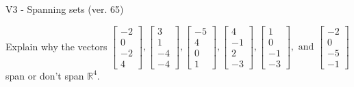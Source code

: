\begin{exercise}
  \begin{exerciseTitle}V3 - Spanning sets (ver. 65)\end{exerciseTitle}
  \begin{exerciseStatement}
    Explain why the vectors \(\left[\begin{array}{r}
-2 \\
0 \\
-2 \\
4
\end{array}\right] , \left[\begin{array}{r}
3 \\
1 \\
-4 \\
-4
\end{array}\right] , \left[\begin{array}{r}
-5 \\
4 \\
0 \\
1
\end{array}\right] , \left[\begin{array}{r}
4 \\
-1 \\
2 \\
-3
\end{array}\right] , \left[\begin{array}{r}
1 \\
0 \\
-1 \\
-3
\end{array}\right] , \text{ and } \left[\begin{array}{r}
-2 \\
0 \\
-5 \\
-1
\end{array}\right]\) span or don't span \(\mathbb{R}^4\). 
	



\end{exerciseStatement}
\end{exercise}
